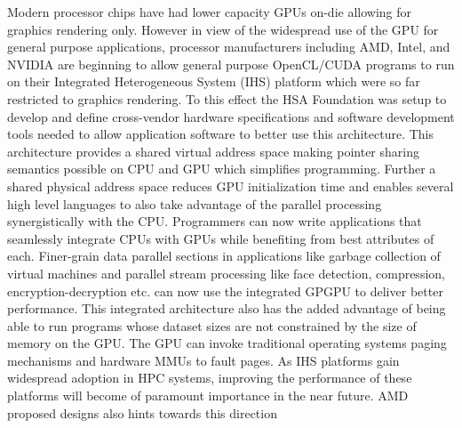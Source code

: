 \par Modern processor chips have had lower capacity GPUs on-die allowing for graphics rendering only. However in view of the widespread use of the GPU for general purpose applications, processor manufacturers including AMD\cite{amd-apu}, Intel\cite{inteliris}, and NVIDIA\cite{denver} are beginning to allow general purpose OpenCL/CUDA programs to run on their Integrated Heterogeneous System (IHS) platform which were so far restricted to graphics rendering. To this effect the HSA Foundation \cite{hsafoundation} was setup to develop and define cross-vendor hardware specifications and software development tools needed to allow application software to better use this architecture. This architecture provides a shared virtual address space making pointer sharing semantics possible on CPU and GPU which simplifies programming. Further a shared physical address space reduces GPU initialization time and enables several high level languages to also take advantage of the parallel processing synergistically with the CPU. Programmers can now write applications that seamlessly integrate CPUs with GPUs while benefiting from best attributes of each. Finer-grain data parallel sections in applications like garbage collection \cite{sumatra} of virtual machines and parallel stream processing like face detection, compression, encryption-decryption etc. can now use the integrated GPGPU to deliver better performance. This integrated architecture also has the added advantage of being able to run programs whose dataset sizes are not constrained by the size of memory on the GPU. The GPU can invoke traditional operating systems paging mechanisms and hardware MMUs to fault pages. As IHS platforms gain widespread adoption in HPC systems, improving the performance of these platforms will become of paramount importance in the near future. AMD proposed designs also hints towards this direction \cite{apu-exascale}
